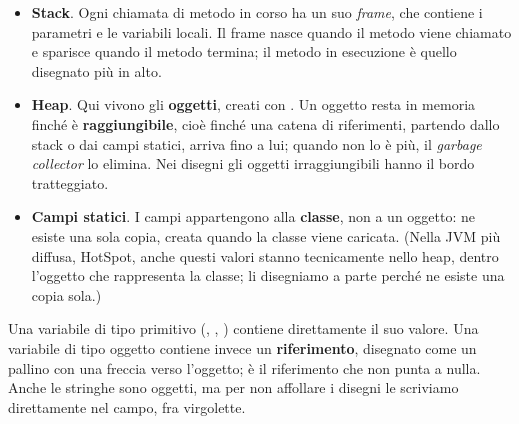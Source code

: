 \begin{itemize}
  \item \textbf{Stack}. Ogni chiamata di metodo in corso ha un suo \textit{frame}, che contiene i parametri e le variabili
        locali. Il frame nasce quando il metodo viene chiamato e sparisce quando il metodo termina; il metodo in esecuzione
        è quello disegnato più in alto.
  \item \textbf{Heap}. Qui vivono gli \textbf{oggetti}, creati con . Un oggetto resta in memoria finché è
        \textbf{raggiungibile}, cioè finché una catena di riferimenti, partendo dallo stack o dai campi statici, arriva fino a
        lui; quando non lo è più, il \textit{garbage collector} lo elimina. Nei disegni gli oggetti irraggiungibili hanno il
        bordo tratteggiato.
  \item \textbf{Campi statici}. I campi  appartengono alla \textbf{classe}, non a un oggetto: ne esiste una sola
        copia, creata quando la classe viene caricata. (Nella JVM più diffusa, HotSpot, anche questi valori stanno
        tecnicamente nello heap, dentro l'oggetto che rappresenta la classe; li disegniamo a parte perché ne esiste una
        copia sola.)
\end{itemize}

Una variabile di tipo primitivo (, , ) contiene direttamente il suo valore. Una
variabile di tipo oggetto contiene invece un \textbf{riferimento}, disegnato come un pallino con una freccia verso
l'oggetto;  è il riferimento che non punta a nulla. Anche le stringhe sono oggetti, ma per non affollare i
disegni le scriviamo direttamente nel campo, fra virgolette.

